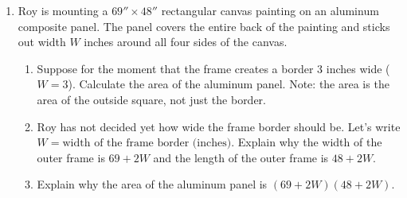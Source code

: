 \begin{enumerate}
She is interested in the variables 
$$M = \text{ amount of Rehab Monster (ounces) }\sim \text{indep}$$
$$C = \text{ amount of caffeine (mg)} \sim \text{ dep}$$

\begin{enumerate}
    \item If Ximena uses 10 ounces of Rehab Monster, how many ounces of Snapple Peach Tea will she use (remember she wants 24 ounces) and how much caffeine will that mixture have? %
    \item If she uses 16 ounces of Rehab Monster, how many ounces of Snapple Peach Tea will she use and how much caffeine with that mixture have?
    \item Write an equation describing how the total caffeine is a function of the amount of Rehab Monster.  Hint: How can we write the amount of Snapple Peach Tea in terms of $M$?
    \item Use the distributive property to simplify your equation.
\end{enumerate}


\item Roy is mounting a $69'' \times 48''$ rectangular canvas painting on an aluminum composite panel. The panel covers the entire back of the painting and sticks out width $W$ inches around all four sides of the canvas. 

\begin{center}
\end{center}

\begin{enumerate}
    \item Suppose for the moment that the frame creates a border 3 inches wide ($W = 3$). Calculate the area of the aluminum panel. Note: the area is the area of the outside square, not just the border.
    \item Roy has not decided yet how wide the frame border should be. Let's write $W = \text{width of the frame border (inches)}$. Explain why the width of the outer frame is $69 + 2W$ and the length of the outer frame is $48 + 2W$.   
    \item Explain why the area of the aluminum panel is $(69 + 2W)(48 + 2W) $.
    

\end{enumerate}
\end{enumerate}
